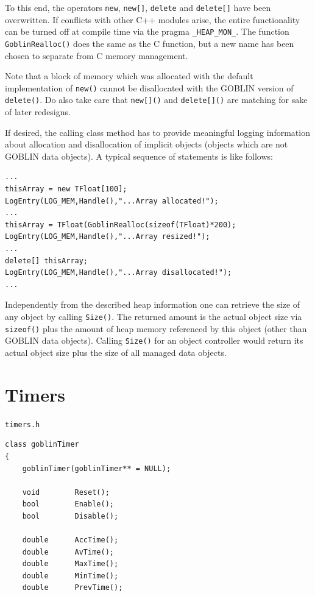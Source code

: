 \documentclass[a4paper,11pt,twoside]{book}
\begin{document}
\begin{multicols}{2}
To this end, the operators \verb/new/, \verb/new[]/, \verb/delete/ and
\verb/delete[]/ have been overwritten. If conflicts with other C++ modules
arise, the entire functionality can be turned off at compile time via the
pragma \verb/_HEAP_MON_/. The function \verb/GoblinRealloc()/ does the same
as the C function, but a new name has been chosen to separate from C memory
management.

Note that a block of memory which was allocated with the default implementation
of \verb/new()/ cannot be disallocated with the GOBLIN version of
\verb/delete()/. Do also take care that \verb/new[]()/ and \verb/delete[]()/
are matching for sake of later redesigns.

If desired, the calling class method has to provide meaningful logging
information about allocation and disallocation of implicit objects (objects
which are not GOBLIN data objects). A typical sequence of statements is like
follows:
\begin{mysample}
\begin{verbatim}
...
thisArray = new TFloat[100];
LogEntry(LOG_MEM,Handle(),"...Array allocated!");
...
thisArray = TFloat(GoblinRealloc(sizeof(TFloat)*200);
LogEntry(LOG_MEM,Handle(),"...Array resized!");
...
delete[] thisArray;
LogEntry(LOG_MEM,Handle(),"...Array disallocated!");
...
\end{verbatim}
\end{mysample}
Independently from the described heap information one can retrieve the
size of any object by calling \verb/Size()/. The returned amount is the
actual object size via \verb/sizeof()/ plus the amount of heap memory
referenced by this object (other than GOBLIN data objects). Calling
\verb/Size()/ for an object controller would return its actual object size
plus the size of all managed data objects.


\section{Timers}
\label{slb_timers}
\myincludes\verb/timers.h/
\begin{mymethods}
\begin{verbatim}
class goblinTimer
{
    goblinTimer(goblinTimer** = NULL);
                    
    void        Reset();
    bool        Enable();
    bool        Disable();

    double      AccTime();
    double      AvTime();
    double      MaxTime();
    double      MinTime();
    double      PrevTime();


\end{verbatim}
\end{mymethods}
\end{multicols}
\end{document}
